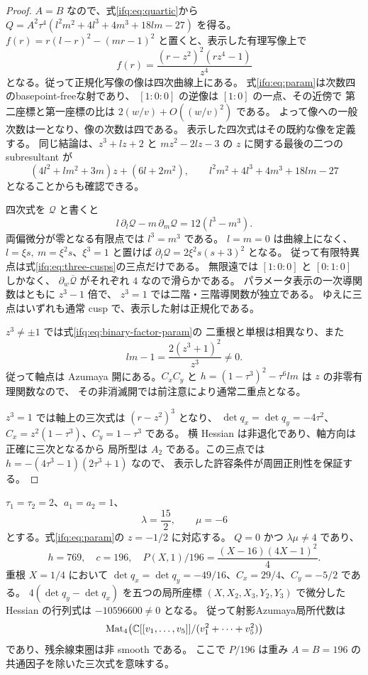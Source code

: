 \begin{proof}
$A=B$ なので、式\eqref{ifq:eq:quartic}から
$Q=A^2\tau^4(l^2m^2+4l^3+4m^3+18lm-27)$ を得る。
$f(r)=r(l-r)^2-(mr-1)^2$ と置くと、表示した有理写像上で
\begin{equation}\label{ifq:eq:binary-factor-param}
       f(r)=\frac{(r-z^2)^2(rz^4-1)}{z^4}
\end{equation}
となる。従って正規化写像の像は四次曲線上にある。
式\eqref{ifq:eq:param}は次数四のbasepoint-freeな射であり、
$[1:0:0]$ の逆像は $[1:0]$ の一点、その近傍で
第二座標と第一座標の比は $2(w/v)+O((w/v)^2)$ である。
よって像への一般次数は一となり、像の次数は四である。
表示した四次式はその既約な像を定義する。
同じ結論は、$z^3+lz+2$ と $mz^2-2lz-3$ の
$z$ に関する最後の二つの subresultant が
\[
 (4l^2+lm^2+3m)z+(6l+2m^2),\qquad
 l^2m^2+4l^3+4m^3+18lm-27
\]
となることからも確認できる。

四次式を $\mathcal Q$ と書くと
\[
       l\,\partial_l\mathcal Q-m\,\partial_m\mathcal Q
                           =12(l^3-m^3).
\]
両偏微分が零となる有限点では $l^3=m^3$ である。
$l=m=0$ は曲線上になく、
$l=\xi s,\ m=\xi^2s$、$\xi^3=1$ と置けば
$\partial_l\mathcal Q=2\xi^2s(s+3)^2$ となる。
従って有限特異点は式\eqref{ifq:eq:three-cusps}の三点だけである。
無限遠では $[1:0:0]$ と $[0:1:0]$ しかなく、
$\partial_w\overline{\mathcal Q}$ がそれぞれ $4$ なので滑らかである。
パラメータ表示の一次導関数はともに $z^3-1$ 倍で、
$z^3=1$ では二階・三階導関数が独立である。
ゆえに三点はいずれも通常 cusp で、表示した射は正規化である。

$z^3\ne\pm1$ では式\eqref{ifq:eq:binary-factor-param}の
二重根と単根は相異なり、また
\[
 lm-1=\frac{2(z^3+1)^2}{z^3}\ne0.
\]
従って軸点は Azumaya 開にある。$C_xC_y$ と
$h=(1-\tau^3)^2-\tau^6lm$ は $z$ の非零有理関数なので、
その非消滅開では前注意により通常二重点となる。

$z^3=1$ では軸上の三次式は $(r-z^2)^3$ となり、
$\det q_x=\det q_y=-4\tau^2$、
$C_x=z^2(1-\tau^3)$、$C_y=1-\tau^3$ である。
横 Hessian は非退化であり、軸方向は正確に三次となるから
局所型は $A_2$ である。この三点では
$h=-(4\tau^3-1)(2\tau^3+1)$ なので、
表示した許容条件が周囲正則性を保証する。
\end{proof}

\begin{example}
\label{ifq:ex:rational-a1}
$\tau_1=\tau_2=2$、$a_1=a_2=1$、
\[
             \lambda=\frac{15}{2},\qquad \mu=-6
\]
とする。式\eqref{ifq:eq:param}の $z=-1/2$ に対応する。
$Q=0$ かつ $\lambda\mu\ne4$ であり、
\[
 h=769,\quad c=196,\quad
 P(X,1)/196=\frac{(X-16)(4X-1)^2}{4}.
\]
重根 $X=1/4$ において
$\det q_x=\det q_y=-49/16$、$C_x=29/4$、$C_y=-5/2$ である。
$4(\det q_y-\det q_x)$ を五つの局所座標
$(X,X_2,X_3,Y_2,Y_3)$ で微分した Hessian の行列式は
$-10596600\ne0$ となる。
従って射影Azumaya局所代数は
\[
 \operatorname{Mat}_4\!\left(
       \mathbb C[[v_1,\ldots,v_5]]/(v_1^2+\cdots+v_5^2)\right)
\]
であり、残余線束圏は非 smooth である。
ここで $P/196$ は重み $A=B=196$ の共通因子を除いた三次式を意味する。
\end{example}

